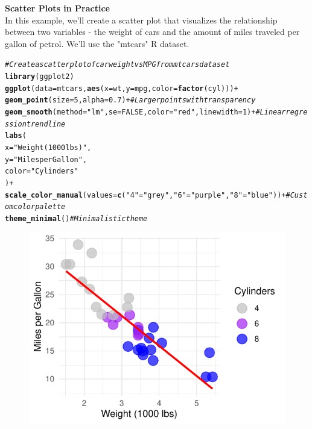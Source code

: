 \documentclass{article}\usepackage[]{graphicx}\usepackage[]{xcolor}
\makeatletter
\def\maxwidth{ %
  \ifdim\Gin@nat@width>\linewidth
    \linewidth
  \else
    \Gin@nat@width
  \fi
}
\newcommand{\hlnum}[1]{\textcolor[rgb]{0.686,0.059,0.569}{#1}}%
\newcommand{\hlstr}[1]{\textcolor[rgb]{0.192,0.494,0.8}{#1}}%
\newcommand{\hlcom}[1]{\textcolor[rgb]{0.678,0.584,0.686}{\textit{#1}}}%
\newcommand{\hlopt}[1]{\textcolor[rgb]{0,0,0}{#1}}%
\newcommand{\hlstd}[1]{\textcolor[rgb]{0.345,0.345,0.345}{#1}}%
\newcommand{\hlkwc}[1]{\textcolor[rgb]{0.333,0.667,0.333}{#1}}%
\newcommand{\hlkwd}[1]{\textcolor[rgb]{0.737,0.353,0.396}{\textbf{#1}}}%
\newenvironment{kframe}{%
 \def\at@end@of@kframe{}%
 \ifinner\ifhmode%
  \def\at@end@of@kframe{\end{minipage}}%
  \begin{minipage}{\columnwidth}%
 \fi\fi%
 \def\FrameCommand##1{\hskip\@totalleftmargin \hskip-\fboxsep
 \colorbox{shadecolor}{##1}\hskip-\fboxsep
     \hskip-\linewidth \hskip-\@totalleftmargin \hskip\columnwidth}%
 \MakeFramed {\advance\hsize-\width
   \@totalleftmargin\z@ \linewidth\hsize
   \@setminipage}}%
 {\par\unskip\endMakeFramed%
 \at@end@of@kframe}
\newenvironment{knitrout}{}{} %
\makeatother
\begin{document}
\textbf{Scatter Plots in Practice}\\
In this example, we'll create a scatter plot that visualizes the relationship between two variables - the weight of cars and the amount of miles traveled per gallon of petrol. We'll use the "mtcars" R dataset.

\begin{knitrout}\scriptsize
{}\color{fgcolor}\begin{kframe}
\begin{alltt}
\hlcom{# Create a scatter plot of car weight vs MPG from mtcars dataset}
\hlkwd{library}\hlstd{(ggplot2)}
\hlkwd{ggplot}\hlstd{(}\hlkwc{data} \hlstd{= mtcars,} \hlkwd{aes}\hlstd{(}\hlkwc{x} \hlstd{= wt,} \hlkwc{y} \hlstd{= mpg,} \hlkwc{color} \hlstd{=} \hlkwd{factor}\hlstd{(cyl)))} \hlopt{+}
  \hlkwd{geom_point}\hlstd{(}\hlkwc{size} \hlstd{=} \hlnum{5}\hlstd{,} \hlkwc{alpha} \hlstd{=} \hlnum{0.7}\hlstd{)} \hlopt{+}  \hlcom{# Larger points with transparency}
  \hlkwd{geom_smooth}\hlstd{(}\hlkwc{method} \hlstd{=} \hlstr{"lm"}\hlstd{,} \hlkwc{se} \hlstd{=} \hlnum{FALSE}\hlstd{,} \hlkwc{color} \hlstd{=} \hlstr{"red"}\hlstd{,} \hlkwc{linewidth} \hlstd{=} \hlnum{1}\hlstd{)} \hlopt{+}  \hlcom{# Linear regression trend line}
  \hlkwd{labs}\hlstd{(}
    \hlkwc{x} \hlstd{=} \hlstr{"Weight (1000 lbs)"}\hlstd{,}
    \hlkwc{y} \hlstd{=} \hlstr{"Miles per Gallon"}\hlstd{,}
    \hlkwc{color} \hlstd{=} \hlstr{"Cylinders"}
  \hlstd{)} \hlopt{+}
  \hlkwd{scale_color_manual}\hlstd{(}\hlkwc{values} \hlstd{=} \hlkwd{c}\hlstd{(}\hlstr{"4"} \hlstd{=} \hlstr{"grey"}\hlstd{,} \hlstr{"6"} \hlstd{=} \hlstr{"purple"}\hlstd{,} \hlstr{"8"} \hlstd{=} \hlstr{"blue"}\hlstd{))} \hlopt{+}  \hlcom{# Custom color palette}
  \hlkwd{theme_minimal}\hlstd{()}  \hlcom{# Minimalistic theme}
\end{alltt}


{\ttfamily\noindent\itshape{}}\end{kframe}\begin{figure}[H]

{\centering \includegraphics[width=\maxwidth]{figure/beamer-scatter-plot-1} 

}
\end{figure}
\end{knitrout}
\end{document}
